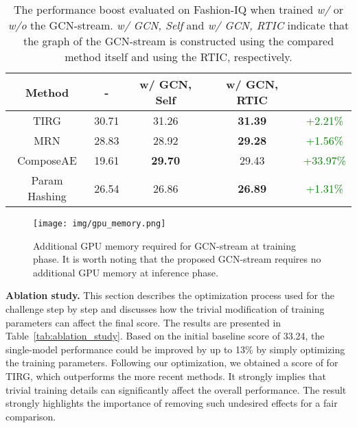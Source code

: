 \documentclass[10pt,twocolumn,letterpaper]{article}
\begin{document}
\begin{table}[h!]
    \caption{The performance boost evaluated on Fashion-IQ when trained \textit{w/} or \textit{w/o} the GCN-stream. \textit{w/ GCN, Self} and \textit{w/ GCN, RTIC} indicate that the graph of the GCN-stream is constructed using the compared method itself and using the RTIC, respectively.}
    \centering
    \begin{adjustbox}{width=0.48\textwidth}
    \begin{tabular}{cccc||c}
    \toprule
    Method          & -         & w/ GCN, Self   & w/ GCN, RTIC     &          \\ \hline \hline
    TIRG            & 30.71     & 31.26          & \textbf{31.39}   & \textcolor{green}{+2.21\%}    \\
    MRN             & 28.83     & 28.92          & \textbf{29.28}   & \textcolor{green}{+1.56\%}    \\
    ComposeAE       & 19.61     & \textbf{29.70} & 29.43            & \textcolor{green}{+33.97\%}   \\
    Param Hashing   & 26.54     & 26.86          & \textbf{26.89}   & \textcolor{green}{+1.31\%}    \\
    \bottomrule
    \end{tabular}
    \end{adjustbox}
    \label{tab:graph_quality}
\end{table}

\begin{figure}[h]
    \begin{center}
	    \texttt{[image: img/gpu\_memory.png]}
	\end{center}
	\caption{Additional GPU memory required for GCN-stream at training phase. It is worth noting that the proposed GCN-stream requires no additional GPU memory at inference phase.}
	\label{fig:gpu_memory}
\end{figure}


\noindent
\textbf{Ablation study.}
This section describes the optimization process used for the challenge step by step and discusses how the trivial modification of training parameters can affect the final score.
The results are presented in Table~\ref{tab:ablation_study}. Based on the initial baseline score of 33.24, the single-model performance could be improved by up to 13\% by simply optimizing the training parameters. Following our optimization, we obtained a score of  for TIRG, which outperforms the more recent methods. It strongly implies that trivial training details can significantly affect the overall performance. The result strongly highlights the importance of removing such undesired effects for a fair comparison.
\end{document}
